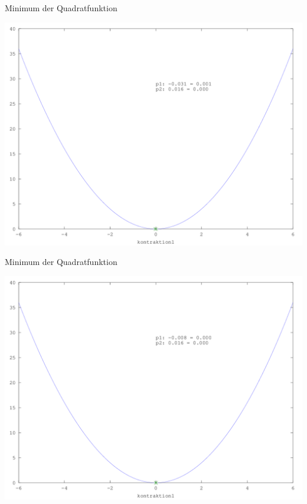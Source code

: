\documentclass[\outputformat]{beamer}
\begin{document}
\begin{frame}{Minimum der Quadratfunktion}
	\begin{center}
		\includegraphics[height=0.75\paperheight]{../bilder/Quadrat/sinx_x009.png}
	\end{center}
\end{frame}
\begin{frame}{Minimum der Quadratfunktion}
	\begin{center}
		\includegraphics[height=0.75\paperheight]{../bilder/Quadrat/sinx_x010.png}
	\end{center}
\end{frame}
\end{document}
